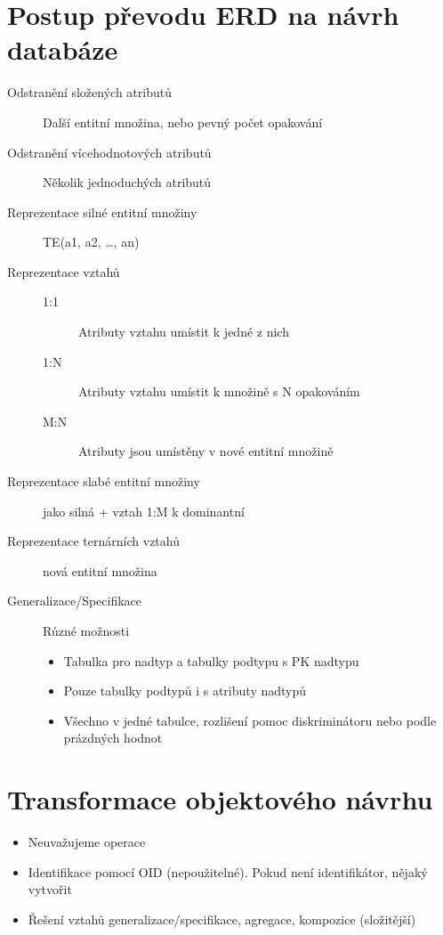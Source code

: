 \documentclass[a4paper, 11pt]{report}
\begin{document}
\section{Postup převodu ERD na návrh databáze}
\begin{description}
	\item[Odstranění složených atributů] Další entitní množina, nebo pevný počet opakování
	\item[Odstranění vícehodnotových atributů] Několik jednoduchých atributů
	\item[Reprezentace silné entitní množiny] TE(a1, a2, \dots, an)
	\item[Reprezentace vztahů] \hfill
	\begin{description}
		\item[1:1] Atributy vztahu umístit k jedné z nich
		\item[1:N] Atributy vztahu umístit k množině s N opakováním
		\item[M:N] Atributy jsou umístěny v nové entitní množině
	\end{description}
	\item[Reprezentace slabé entitní množiny] jako silná + vztah 1:M k dominantní
	\item[Reprezentace ternárních vztahů] nová entitní množina
	\item[Generalizace/Specifikace] Různé možnosti
	\begin{itemize}
		\item Tabulka pro nadtyp a tabulky podtypu s PK nadtypu
		\item Pouze tabulky podtypů i s atributy nadtypů
		\item Všechno v jedné tabulce, rozlišení pomoc diskriminátoru nebo podle prázdných hodnot
	\end{itemize}
\end{description}

\section{Transformace objektového návrhu}
\begin{itemize}
	\item Neuvažujeme operace
	\item Identifikace pomocí OID (nepoužitelné). Pokud není identifikátor, nějaký vytvořit
	\item Řešení vztahů generalizace/specifikace, agregace, kompozice (složitější)
\end{itemize}
\end{document}
